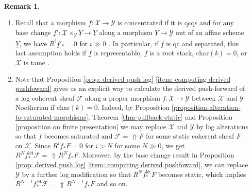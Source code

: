 \documentclass[11pt]{amsart}
\theoremstyle{definition}
\theoremstyle{definition}
\newtheorem{remark}[theorem]{Remark}
\DeclareMathOperator{\arrowup}{\!\Uparrow \!}
\newcommand{\cX}{\mathcal{X}}
\newcommand{\ul}[1]{\underline{#1}}
\newcommand{\cal}{\mathcal}
\def\cX{{\cal X}}
\begin{document}
\begin{remark}\label{remark: how to compute higher derived push}
    \begin{enumerate}
        \item Recall that a morphism $\underline{f}\colon \underline{\mathcal{X}}\rightarrow\underline{\mathcal{Y}}$ is concentrated if it is qcqs and for any base change $\underline{f}'\colon \underline{\mathcal{X}}\times_\mathcal{\underline{Y}} \underline{Y}\rightarrow \underline{Y}$ along a morphism $\underline{Y}\rightarrow\underline{\mathcal{Y}}$ out of an affine scheme $\underline{Y}$, we have $R^{i}\underline{f}{}'_*=0$ for $i\gg 0$ \cite[Definition 2.4]{HallRydh2017}. In particular, if $\ul{f}$ is qc and separated, this last assumption holds if $\underline{f}$ is representable, $f$ is a root stack, $\text{char}(k)=0$, or $\cX$ is tame \cite[Theorem 2.1]{HallRydhWhatStacksAreConcenctrated}.
        \item Note that Proposition \ref{prop: derived push log} \eqref{item: computing derived pushfoward} gives us an explicit way to calculate the derived push-forward of a log coherent sheaf $\mathcal{F}$ along a proper morphism $f\colon \mathcal{X}\rightarrow\mathcal{Y}$ between $\mathcal{X}$ and $\mathcal{Y}$ Noetherian if $\text{char}(k)=0$. Indeed, by Proposition \ref{proposition-alteration-to-saturated-morphisms}, Theorem \ref{thm-pullback-static} and Proposition \ref{proposition on finite presentation} we may replace $\mathcal{X}$ and $\mathcal{Y}$ by log alterations so that $f$ becomes saturated and $\mathcal{F}=\arrowup F$ for some static coherent sheaf $F$ on $\underline{\mathcal{X}}$. Since $R^{i}\underline{f}{}_*F=0$ for $i>N$ for some $N\gg0$, we get $R^N f^{\text{l\'et}}_*\mathcal{F} = \arrowup R^N\underline{f}{}_*F$. Moreover, by the base change result in Proposition \ref{prop: derived push log} \eqref{item: computing derived pushfoward}, we can replace $\mathcal{Y}$ by a further log modification so that $R^{N}f^{\text{l\'et}}_*F$ becomes static, which implies $R^{N-1}f^{\text{l\'et}}_*\mathcal{F} = \arrowup R^{N-1}\underline{f}{}_*F$ and so on.
    \end{enumerate}
\end{remark}
\end{document}
